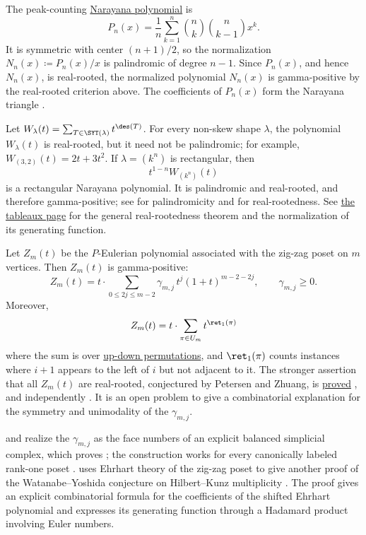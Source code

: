 \begin{theorem}
The peak-counting \hyperref[realRootedCatalan]{Narayana polynomial} is
\[
 P_n(x) = \frac{1}{n}\sum_{k=1}^n
 \binom{n}{k}\binom{n}{k-1} x^k.
\]
It is symmetric with center $(n+1)/2$, so the normalization
$N_n(x)\coloneqq P_n(x)/x$ is palindromic of degree $n-1$.
Since $P_n(x)$, and hence $N_n(x)$, is real-rooted, the normalized polynomial
$N_n(x)$ is gamma-positive by the real-rooted criterion above.  The
coefficients of $P_n(x)$ form the Narayana triangle .
\end{theorem}


\begin{theorem}
Let $W_\lambda(t) = \sum_{T \in \SYT(\lambda)} t^{\des(T)}$.
For every non-skew shape $\lambda$, the polynomial $W_\lambda(t)$ is
real-rooted, but it need not be palindromic; for example,
$W_{(3,2)}(t)=2t+3t^2$.
If $\lambda=(k^n)$ is rectangular, then
\[
  t^{1-n}W_{(k^n)}(t)
\]
is a rectangular Narayana polynomial.  It is palindromic and real-rooted,
and therefore gamma-positive; see \cite[Eq.~(11)]{Elizalde2025Canon} for
palindromicity and \cite[Thm.~3.1]{ChenYangZhang2018Rectangular} for
real-rootedness.
See \hyperref[realRootedTableaux]{the tableaux page} for the general
real-rootedness theorem and the normalization of its generating function.
\end{theorem}


\begin{theorem}
\label{zigZagEulerianGammaPositive}
Let $Z_m(t)$ be the $P$-Eulerian polynomial associated with the zig-zag poset
on $m$ vertices.
Then $Z_m(t)$ is gamma-positive:
\[
 Z_m(t) = t \cdot \sum_{0 \leq 2j \leq m-2} \gamma_{m,j}\,t^j (1+t)^{m-2-2j}, \qquad \gamma_{m,j} \geq 0.
\]
Moreover,
\[
 Z_m(t) = t \cdot \sum_{\pi \in U_m} t^{\ret_1(\pi)}
\]
where the sum is over \hyperref[namedPermutations]{up-down permutations},
and $\ret_1(\pi)$ counts instances where $i+1$ appears to the left of $i$ but not adjacent to it.
The stronger assertion that all \(Z_m(t)\) are real-rooted, conjectured by
Petersen and Zhuang, is \hyperref[zigZagEulerianRealRooted]{proved}
\cite[Thm.~7.1]{Alexandersson2026Eulerian}, and independently
\cite[Thm.~1.1]{Torres2026x}.
It is an open problem to give a combinatorial explanation for the symmetry and
unimodality of the $\gamma_{m,j}$.
\end{theorem}
 and  realize the $\gamma_{m,j}$ as the face
numbers of an explicit balanced simplicial complex, which proves
\cite[Conj.~6.1(c)]{PetersenZhuang2024x}; the construction works for every
canonically labeled rank-one poset \cite[Thm.~1.1, Thm.~1.2]{ShiWang2026x}.
 uses Ehrhart theory of the zig-zag poset to give another
proof of the Watanabe--Yoshida conjecture on Hilbert--Kunz multiplicity
\cite{Kahane2025x}.  The proof gives an explicit combinatorial formula for
the coefficients of the shifted Ehrhart polynomial and expresses its
generating function through a Hadamard product involving Euler numbers.


